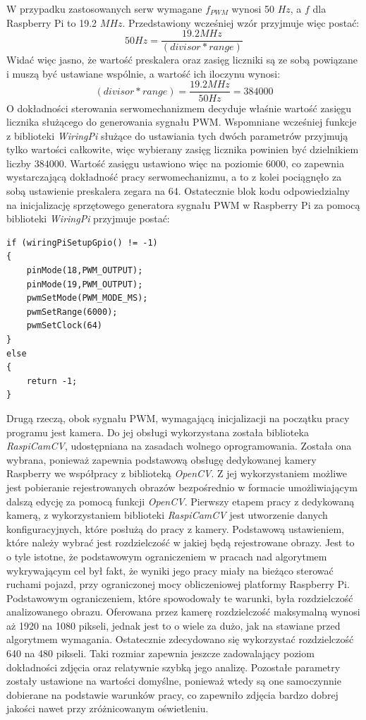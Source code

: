 W przypadku zastosowanych serw wymagane $f_{PWM}$ wynosi 50 $Hz$, a $f$ dla Raspberry Pi to 19.2 $MHz$. Przedstawiony wcześniej wzór przyjmuje więc postać:
\begin{equation}
50 Hz = \frac{19.2 MHz}{(divisor * range)}
\label{eq:hard_pwmN}
\end{equation}
Widać więc jasno, że wartość preskalera oraz zasięg liczniki są ze sobą powiązane i muszą być ustawiane wspólnie, a wartość ich iloczynu wynosi:
\begin{equation}
(divisor * range) = \frac{19.2 MHz}{50 Hz} = 384000
\label{eq:range_x_presc}
\end{equation}
O dokładności sterowania serwomechanizmem decyduje właśnie wartość zasięgu licznika służącego do generowania sygnału PWM. Wspomniane wcześniej funkcje z biblioteki \textit{WiringPi} służące do ustawiania tych dwóch parametrów przyjmują tylko wartości całkowite, więc wybierany zasięg licznika powinien być dzielnikiem liczby $384000$. Wartość zasięgu ustawiono więc na poziomie 6000, co zapewnia wystarczającą dokładność pracy serwomechanizmu, a to z kolei pociągnęło za sobą ustawienie preskalera zegara na 64. Ostatecznie blok kodu odpowiedzialny na inicjalizację sprzętowego generatora sygnału PWM w Raspberry Pi za pomocą biblioteki \textit{WiringPi} przyjmuje postać:
\begin{lstlisting}
if (wiringPiSetupGpio() != -1)
{
	pinMode(18,PWM_OUTPUT);
	pinMode(19,PWM_OUTPUT);
	pwmSetMode(PWM_MODE_MS);
	pwmSetRange(6000);
	pwmSetClock(64)
}
else
{
	return -1;
}
\end{lstlisting}

Drugą rzeczą, obok sygnału PWM, wymagającą inicjalizacji na początku pracy programu jest kamera. Do jej obsługi wykorzystana została biblioteka \textit{RaspiCamCV}, udostępniana na zasadach wolnego oprogramowania. Została ona wybrana, ponieważ zapewnia podstawową obsługę dedykowanej kamery Raspberry we współpracy z biblioteką \textit{OpenCV}. Z jej wykorzystaniem możliwe jest pobieranie rejestrowanych obrazów bezpośrednio w formacie umożliwiającym dalszą edycję za pomocą funkcji \textit{OpenCV}. Pierwszy etapem pracy z dedykowaną kamerą, z wykorzystaniem biblioteki \textit{RaspiCamCV} jest utworzenie danych konfiguracyjnych, które posłużą do pracy z kamery. Podstawową ustawieniem, które należy wybrać jest rozdzielczość w jakiej będą rejestrowane obrazy. Jest to o tyle istotne, że podstawowym ograniczeniem w pracach nad algorytmem wykrywającym cel był fakt, że wyniki jego pracy miały na bieżąco sterować ruchami pojazd, przy ograniczonej mocy obliczeniowej platformy Raspberry Pi. Podstawowym ograniczeniem, które spowodowały te warunki, była rozdzielczość analizowanego obrazu. Oferowana przez kamerę rozdzielczość maksymalną wynosi aż 1920 na 1080 pikseli, jednak jest to o wiele za dużo, jak na stawiane przed algorytmem wymagania. Ostatecznie zdecydowano się wykorzystać rozdzielczość 640 na 480 pikseli. Taki rozmiar zapewnia jeszcze zadowalający poziom dokładności zdjęcia oraz relatywnie szybką jego analizę. Pozostałe parametry zostały ustawione na wartości domyślne, ponieważ wtedy są one samoczynnie dobierane na podstawie warunków pracy, co zapewniło zdjęcia bardzo dobrej jakości nawet przy zróżnicowanym oświetleniu.

